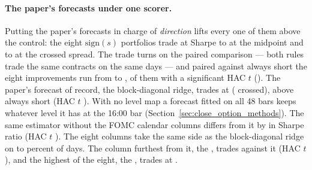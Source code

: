 \paragraph{The paper's forecasts under one scorer.} Putting the paper's
forecasts in charge of \emph{direction} lifts every one of them above the
control: the eight $\mathrm{sign}(s)$ portfolios trade at Sharpe
\cmPaperShMin{} to \cmPaperShMax{} at the midpoint and \cmPaperXMin{} to %
\cmPaperXMax{} at the crossed spread. The trade turns on the paired comparison
--- both rules trade the same contracts on the same days --- and paired against
always short the eight improvements run from \cmPaperVsShortMin{} to
\cmPaperVsShortMax{}, \cmPaperVsShortAboveSigN{} of them with a significant HAC $t$ %
(\cmPaperVsShortAboveSigWho).
The paper's forecast
of record, the block-diagonal ridge, trades at \cmRefShMid{} (\cmRefShX{} %
crossed), \cmRefVsShort{} above always short (HAC $t$ \cmRefVsShortT). With no level map a %
forecast fitted on all 48 bars keeps whatever level it has at the 16:00 bar
(Section~\ref{sec:close_option_methods}). The same estimator without the
FOMC calendar columns differs from it by \cmFomcD{} in Sharpe ratio (HAC $t$
\cmFomcDT). The eight %
columns take the same side as the block-diagonal ridge on \cmPaperSameMin{} to %
\cmPaperSameMax{} percent of days.
The column furthest from it, the \cmPaperFarLabel, trades \cmPaperFarVsRef{} against %
it (HAC $t$ \cmPaperFarVsRefT), and the highest of the eight, the \cmPaperBestLabel,
trades at \cmPaperBestSh.

